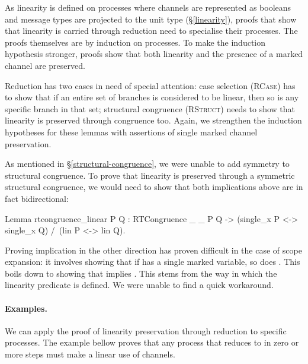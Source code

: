 \documentclass{mproj}
\begin{document}


As linearity is defined on processes where channels are represented as booleans and message types are projected to the unit type (\S \ref{linearity}), proofs that show that linearity is carried through reduction need to specialise their processes. The proofs themselves are by induction on processes. To make the induction hypothesis stronger, proofs show that both linearity and the presence of a marked channel are preserved.


Reduction has two cases in need of special attention: case selection (\textsc{RCase}) has to show that if an entire set of branches is considered to be linear, then so is any specific branch in that set; structural congruence (\textsc{RStruct}) needs to show that linearity is preserved through congruence too. Again, we strengthen the induction hypotheses for these lemmas with assertions of single marked channel preservation.



As mentioned in \S \ref{structural-congruence}, we were unable to add symmetry to structural congruence. To prove that linearity is preserved through a symmetric structural congruence, we would need to show that both implications above are in fact bidirectional:

\begin{coq}
Lemma rtcongruence_linear {P Q} : RTCongruence _ _ P Q ->
  (single_x P <-> single_x Q) /\ (lin P <-> lin Q).
\end{coq}

Proving implication in the other direction has proven difficult in the case of scope expansion: it involves showing that if  has a single marked variable, so does . This boils down to showing that  implies . This stems from the way in which the linearity predicate is defined. We were unable to find a quick workaround.

\paragraph{Examples.}
We can apply the proof of linearity preservation through reduction to specific processes. The example bellow proves that any process that  reduces to in zero or more steps must make a linear use of channels.
\end{document}
